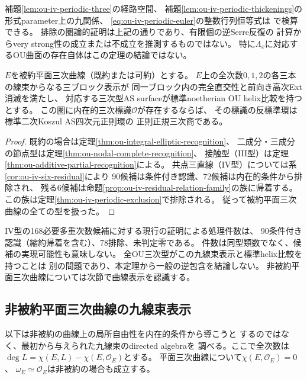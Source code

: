 \begin{remark}
補題\ref{lem:ou-iv-periodic-three}の経路空間、
補題\ref{lem:ou-iv-periodic-thickenings}の形式parameter上の九関係、
\eqref{eq:ou-iv-periodic-euler}の整数行列恒等式は
 で検算できる。
排除の圏論的証明は上記の通りであり、有限個の逆Serre反復の
計算からvery strong性の成立または不成立を推測するものではない。
特に$\Lambda_x$に対応するOU曲面の存在自体はこの定理の結論ではない。
\end{remark}

\begin{theorem}[被約平面三次曲線表示を持つOU型の完全認識]
\label{thm:ou-reduced-complete-recognition}
$E$を被約平面三次曲線（既約または可約）とする。
$E$上の全次数$0,1,2$の各三本の線束からなる三ブロック表示が
同一ブロック内の完全直交性と前向き高次Ext消滅を満たし、
対応する三次型AS surfaceが標準noetherian OU helix比較を持つとする。
この圏に内在的三次標識$\mathcal O$が存在するならば、
その標識の反標準環は標準二次Koszul AS四次元正則環の
正則正規三次商である。
\end{theorem}
\begin{proof}
既約の場合は定理\ref{thm:ou-integral-elliptic-recognition}、
二成分・三成分の節点型は定理\ref{thm:ou-nodal-complete-recognition}、
接触型（III型）は定理\ref{thm:ou-additive-partial-recognition}による。
共点三直線（IV型）については系\ref{cor:ou-iv-six-residual}により
90候補は条件付き認識、72候補は内在的条件から排除され、
残る6候補は命題\ref{prop:ou-iv-residual-relation-family}の族に帰着する。
この族は定理\ref{thm:ou-iv-periodic-exclusion}で排除される。
従って被約平面三次曲線の全ての型を扱った。
\end{proof}

\begin{remark}
IV型の168必要多重次数候補に対する現行の証明による処理件数は、
90条件付き認識（縮約帰着を含む）、78排除、未判定零である。
件数は同型類数でなく、候補の実現可能性も意味しない。
全OU三次型がこの九線束表示と標準helix比較を持つことは
別の問題であり、本定理から一般の逆包含を結論しない。
非被約平面三次曲線については次節で曲線表示を認識する。
\end{remark}

\subsection{非被約平面三次曲線の九線束表示}
\label{subsec:ou-nonreduced-cubic}

以下は非被約の曲線上の局所自由性を内在的条件から導こうと
するのではなく、最初から与えられた九線束のdirected algebraを
調べる。ここで全次数は$\deg L=\chi(E,L)-\chi(E,\mathcal O_E)$とする。
平面三次曲線について$\chi(E,\mathcal O_E)=0$、
$\omega_E\simeq\mathcal O_E$は非被約の場合も成立する。

